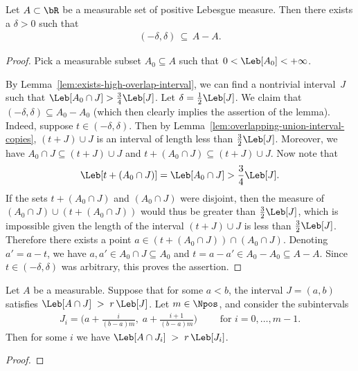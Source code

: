 \begin{lemma}
  \label{lem:difference-set-contains-interval}
  \leanok
  Let $A \subset \bR$ be a measurable set of positive Lebesgue measure.
  Then there exists a $\delta > 0$ such that
  \begin{align*}
    (-\delta,\delta) \, \subseteq \, A - A .
  \end{align*}
\end{lemma}
\begin{proof}
  Pick a measurable subset $A_0 \subseteq A$ such that
  $0 < \Leb[A_0] < +\infty$.

  By Lemma~\ref{lem:exists-high-overlap-interval}, we can find a nontrivial interval~$J$
  such that $\Leb[A_0 \cap J] > \frac{3}{4} \Leb[J]$.
  Let $\delta = \frac{1}{2} \Leb[J]$.
  We claim that $(-\delta,\delta) \subseteq A_0 - A_0$ (which then
  clearly implies the assertion of the lemma).
  Indeed, suppose $t \in (-\delta,\delta)$.
  Then by Lemma~\ref{lem:overlapping-union-interval-copies},
  $(t+J) \cup J$ is an interval of length less than $\frac{3}{2} \Leb[J]$.
  Moreover, we have $A_0 \cap J \subseteq (t+J) \cup J$ and
  $t+(A_0 \cap J) \subseteq (t+J) \cup J$. Now note that
  \begin{align*}
    \Leb[t + (A_0 \cap J)] = \Leb[A_0 \cap J] > \frac{3}{4} \Leb[J] .
  \end{align*}
  If the sets $t + (A_0 \cap J)$ and $(A_0 \cap J)$ were disjoint, then
  the measure of $(A_0 \cap J) \cup (t+(A_0 \cap J))$ would thus be
  greater than $\frac{3}{2} \Leb[J]$, which is impossible given the length
  of the interval $(t+J) \cup J$ is less than $\frac{3}{2} \Leb[J]$.
  Therefore there exists a point $a \in (t + (A_0 \cap J)) \cap (A_0 \cap J)$.
  Denoting $a' = a - t$, we have $a, a' \in A_0 \cap J \subseteq A_0$
  and $t = a - a' \in A_0 - A_0 \subseteq A - A$. Since $t \in (-\delta,\delta)$
  was arbitrary, this proves the assertion.
\end{proof}

\begin{lemma}
  \label{lem:dividing-high-operlap-interval}
  Let $A$ be a measurable. Suppose that for some $a < b$,
  the interval $J = (a,b)$ satisfies
  $\Leb[A \cap J] \; > \;  r \, \Leb[J]$. %
  Let $m \in \Npos$, and consider the subintervals
  \begin{align*}
    J_i = \Big( a + \frac{i}{(b-a)m} , \; a + \frac{i+1}{(b-a)m} \Big)
    \qquad \text{ for $i = 0, \ldots, m-1$.}
  \end{align*}
  Then for some $i$ we have $\Leb[A \cap J_i] \; > \;  r \, \Leb[J_i]$.
\end{lemma}
\begin{proof}
\end{proof}

